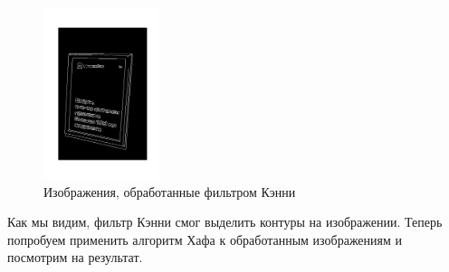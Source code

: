 \documentclass[a4paper,12pt]{article}
\begin{document}
\begin{figure}[H]
\begin{minipage}{0.48\textwidth}
    \end{minipage}
    \includegraphics[width=0.3\textwidth]{images/hough_lines/3_proc_canny.png}
    \caption{Изображения, обработанные фильтром Кэнни}
\end{figure}

\noindent Как мы видим, фильтр Кэнни смог выделить контуры на изображении. Теперь попробуем применить алгоритм Хафа к обработанным изображениям и посмотрим на результат.
\end{document}
